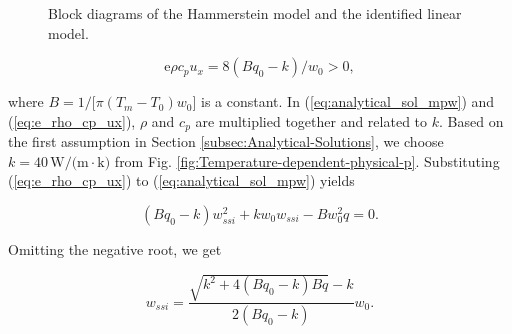 \documentclass [11pt, proquest] {uwthesis}[2020/02/24]
\begin{document}
\begin{figure}[!ht]
\begin{centering}
\par\end{centering}
\caption{\label{fig:Block-diagram-of-H}Block diagrams of the Hammerstein model
and the identified linear model.}
\end{figure}

\noindent 
\begin{equation}
\text{e}\rho c_{p}u_{x}=8(Bq_{0}-k)/w_{0}>0,\label{eq:e_rho_cp_ux}
\end{equation}

\noindent where $B=1/\text{[}\pi(T_{m}-T_{0})w_{0}]$ is a constant.
In (\ref{eq:analytical_sol_mpw}) and (\ref{eq:e_rho_cp_ux}), $\rho$
and $c_{p}$ are multiplied together and related to $k$. Based on
the first assumption in Section \ref{subsec:Analytical-Solutions},
we choose $k=40\,\text{W/(m}\cdot\text{k)}$ from Fig. \ref{fig:Temperature-dependent-physical-p}.
Substituting (\ref{eq:e_rho_cp_ux}) to (\ref{eq:analytical_sol_mpw})
yields

\noindent 
\begin{equation}
(Bq_{0}-k)w_{ssi}^{2}+kw_{0}w_{ssi}-Bw_{0}^{2}q=0.\label{eq:w_0}
\end{equation}

\noindent Omitting the negative root, we get

\noindent 
\begin{equation}
w_{ssi}=\frac{\sqrt{k^{2}+4(Bq_{0}-k)Bq}-k}{2(Bq_{0}-k)}w_{0}.\label{eq:w}
\end{equation}
\end{document}
